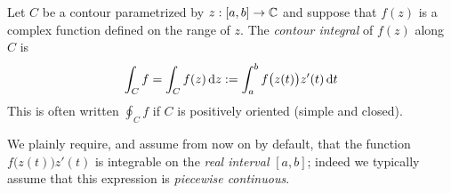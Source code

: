 \begin{defn}{}{}
	Let $C$ be a contour parametrized by $z:[a,b]\to\mathbb{C}$ and suppose that $f(z)$ is a complex function defined on the range of $z$. The \emph{contour integral} of $f(z)$ along $C$ is
	\[
		\int_Cf=\int_Cf(z)\,{\mathrm{d} z}:=\int_a^bf\bigl(z(t)\bigr) z'(t)\,{\mathrm{d} t}
	\]
	This is often written $\oint_Cf$ if $C$ is positively oriented (simple and closed).
\end{defn}

We plainly require, and assume from now on by default, that the function $f\bigl(z(t)\bigr)z'(t)$ is integrable on the \emph{real interval} $[a,b]$; indeed we typically assume that this expression is \emph{piecewise continuous}. %
\goodbreak




